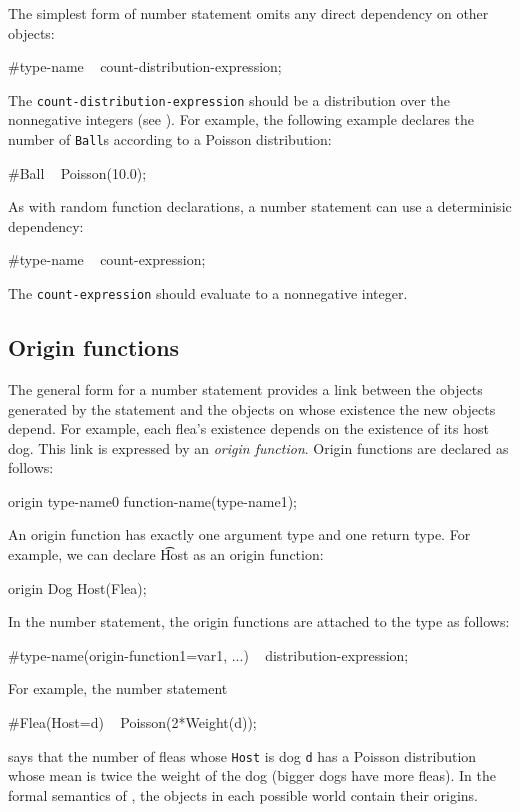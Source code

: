 \documentclass[12pt]{article}
\begin{document}
The simplest form of number statement omits any direct dependency on other objects:
\begin{blogcode}
#type-name ~ count-distribution-expression;
\end{blogcode}
The {\tt count-distribution-expression} should be a distribution over
the nonnegative integers (see ).
For example, the following example declares the number of \texttt{Ball}s according to a Poisson distribution:
\begin{blogcode}
#Ball ~ Poisson(10.0);
\end{blogcode}
As with random function declarations, a number statement can use a determinisic dependency:
\begin{blogcode}
#type-name ~ count-expression;
\end{blogcode}
The {\tt count-expression} should evaluate to a nonnegative integer.

\subsection{Origin functions}\label{origin-section}
The general form for a number statement provides a link between the objects generated by the statement
and the objects on whose existence the new objects depend. For example, each flea's existence
depends on the existence of its host dog. This link is expressed by an {\em origin function}.
Origin functions are declared as follows:
\begin{blogcode}
origin type-name0 function-name(type-name1);
\end{blogcode}
An origin function has exactly one argument type and one return type.  
For example, we can declare {\t Host} as an origin function:
\begin{blogcode}
origin Dog Host(Flea);
\end{blogcode}

In the number statement, the origin functions are attached to the type 
as follows:
\begin{blogcode}
#type-name(origin-function1=var1, ...) ~ distribution-expression;
\end{blogcode}
For example, the number statement
\begin{blogcode}
#Flea(Host=d) ~ Poisson(2*Weight(d));
\end{blogcode}
says that the number of fleas whose {\tt Host} is dog {\tt d} has a Poisson distribution whose mean is twice the weight of the dog (bigger dogs have more fleas).
In the formal semantics of \bl, the objects in each possible world contain their origins.
\end{document}
